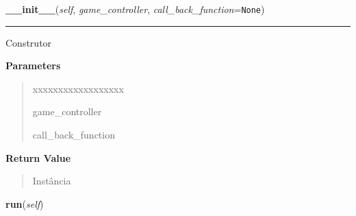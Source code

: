\hspace{.8\funcindent}\begin{boxedminipage}{\funcwidth}

    \raggedright \textbf{\_\_init\_\_}(\textit{self}, \textit{game\_controller}, \textit{call\_back\_function}={\tt None})

    \vspace{-1.5ex}

    \rule{\textwidth}{0.5\fboxrule}
\setlength{\parskip}{2ex}
    Construtor

\setlength{\parskip}{1ex}
      \textbf{Parameters}
      \vspace{-1ex}

      \begin{quote}
        \begin{Ventry}{xxxxxxxxxxxxxxxxxx}

          \item[game\_controller]

          \item[call\_back\_function]

        \end{Ventry}

      \end{quote}

      \textbf{Return Value}
    \vspace{-1ex}

      \begin{quote}
      Instância

      \end{quote}

    \end{boxedminipage}

    \label{pygame-asteroids:menu_helper:MainMenu:run}

    \vspace{0.5ex}

\hspace{.8\funcindent}\begin{boxedminipage}{\funcwidth}

    \raggedright \textbf{run}(\textit{self})

\setlength{\parskip}{2ex}
\setlength{\parskip}{1ex}
    \end{boxedminipage}

